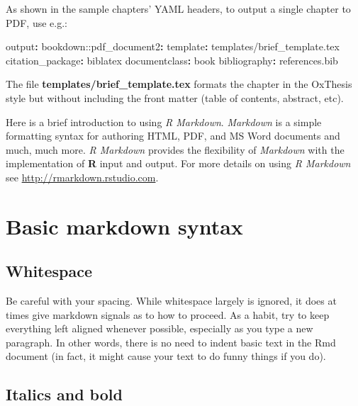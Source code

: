 \documentclass[a4paper, nobind]{templates/ociamthesis}
\newenvironment{Shaded}{\begin{snugshade}}{\end{snugshade}}
\newcommand{\AttributeTok}[1]{\textcolor[rgb]{0.77,0.63,0.00}{#1}}
\newcommand{\FunctionTok}[1]{\textcolor[rgb]{0.00,0.00,0.00}{#1}}
\newcommand{\KeywordTok}[1]{\textcolor[rgb]{0.13,0.29,0.53}{\textbf{#1}}}
\renewenvironment{Shaded}
{
  \vspace{10pt}%
  \begin{snugshade}%
}{%
  \end{snugshade}%
  \vspace{8pt}%
}
\begin{document}
As shown in the sample chapters' YAML headers, to output a single chapter to PDF, use e.g.:

\begin{Shaded}
\begin{Highlighting}[]
\FunctionTok{output}\KeywordTok{:}
\AttributeTok{  bookdown:}\FunctionTok{:pdf\_document2}\KeywordTok{:}
\AttributeTok{    }\FunctionTok{template}\KeywordTok{:}\AttributeTok{ templates/brief\_template.tex}
\AttributeTok{    }\FunctionTok{citation\_package}\KeywordTok{:}\AttributeTok{ biblatex}
\FunctionTok{documentclass}\KeywordTok{:}\AttributeTok{ book}
\FunctionTok{bibliography}\KeywordTok{:}\AttributeTok{ references.bib}
\end{Highlighting}
\end{Shaded}

The file \textbf{templates/brief\_template.tex} formats the chapter in the OxThesis style but without including the front matter (table of contents, abstract, etc).

Here is a brief introduction to using \emph{R Markdown}.
\emph{Markdown} is a simple formatting syntax for authoring HTML, PDF, and MS Word documents and much, much more.
\emph{R Markdown} provides the flexibility of \emph{Markdown} with the implementation of \textbf{R} input and output. For more details on using \emph{R Markdown} see \url{http://rmarkdown.rstudio.com}.

\hypertarget{basic-markdown-syntax}{%
\section{Basic markdown syntax}\label{basic-markdown-syntax}}

\hypertarget{whitespace}{%
\subsection{Whitespace}\label{whitespace}}

Be careful with your spacing.
While whitespace largely is ignored, it does at times give markdown signals as to how to proceed.
As a habit, try to keep everything left aligned whenever possible, especially as you type a new paragraph.
In other words, there is no need to indent basic text in the Rmd document (in fact, it might cause your text to do funny things if you do).

\hypertarget{italics-and-bold}{%
\subsection{Italics and bold}\label{italics-and-bold}}
\end{document}
